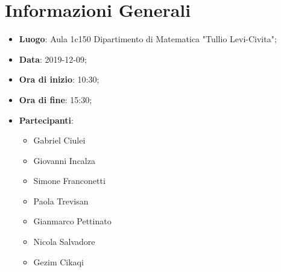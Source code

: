 \section{Informazioni Generali}
	\begin{itemize}
		\item \textbf {Luogo}: Aula 1c150 Dipartimento di Matematica "Tullio Levi-Civita";
		\item \textbf {Data}: 2019-12-09;
		\item \textbf {Ora di inizio}: 10:30;
		\item \textbf {Ora di fine}: 15:30;
		\item \textbf {Partecipanti}:
			\begin{itemize}
				\item Gabriel Ciulei
				\item Giovanni Incalza
				\item Simone Franconetti
				\item Paola Trevisan
				\item Gianmarco Pettinato
				\item Nicola Salvadore
				\item Gezim Cikaqi
			\end{itemize}
	\end{itemize}
